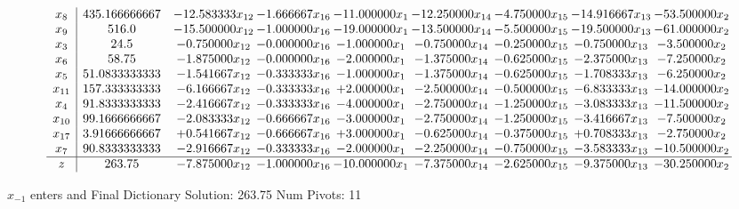 \documentclass[10pt]{article}
\begin{document}
 \[\begin{array}{c| c c@{\hskip 2pt} c@{\hskip 2pt} c@{\hskip 2pt} c@{\hskip 2pt} c@{\hskip 2pt} c@{\hskip 2pt} c@{\hskip 2pt} }
 x_{8}   &  435.166666667 & -12.583333 x_{12} & -1.666667 x_{16} & -11.000000 x_{1} & -12.250000 x_{14} & -4.750000 x_{15} & -14.916667 x_{13} & -53.500000 x_{2}\\
 x_{9}   &  516.0 & -15.500000 x_{12} & -1.000000 x_{16} & -19.000000 x_{1} & -13.500000 x_{14} & -5.500000 x_{15} & -19.500000 x_{13} & -61.000000 x_{2}\\
 x_{3}   &  24.5 & -0.750000 x_{12} & -0.000000 x_{16} & -1.000000 x_{1} & -0.750000 x_{14} & -0.250000 x_{15} & -0.750000 x_{13} & -3.500000 x_{2}\\
 x_{6}   &  58.75 & -1.875000 x_{12} & -0.000000 x_{16} & -2.000000 x_{1} & -1.375000 x_{14} & -0.625000 x_{15} & -2.375000 x_{13} & -7.250000 x_{2}\\
 x_{5}   &  51.0833333333 & -1.541667 x_{12} & -0.333333 x_{16} & -1.000000 x_{1} & -1.375000 x_{14} & -0.625000 x_{15} & -1.708333 x_{13} & -6.250000 x_{2}\\
 x_{11}   &  157.333333333 & -6.166667 x_{12} & -0.333333 x_{16} & + 2.000000 x_{1} & -2.500000 x_{14} & -0.500000 x_{15} & -6.833333 x_{13} & -14.000000 x_{2}\\
 x_{4}   &  91.8333333333 & -2.416667 x_{12} & -0.333333 x_{16} & -4.000000 x_{1} & -2.750000 x_{14} & -1.250000 x_{15} & -3.083333 x_{13} & -11.500000 x_{2}\\
 x_{10}   &  99.1666666667 & -2.083333 x_{12} & -0.666667 x_{16} & -3.000000 x_{1} & -2.750000 x_{14} & -1.250000 x_{15} & -3.416667 x_{13} & -7.500000 x_{2}\\
 x_{17}   &  3.91666666667 & + 0.541667 x_{12} & -0.666667 x_{16} & + 3.000000 x_{1} & -0.625000 x_{14} & -0.375000 x_{15} & + 0.708333 x_{13} & -2.750000 x_{2}\\
 x_{7}   &  90.8333333333 & -2.916667 x_{12} & -0.333333 x_{16} & -2.000000 x_{1} & -2.250000 x_{14} & -0.750000 x_{15} & -3.583333 x_{13} & -10.500000 x_{2}\\
\hline
z    &  263.75 & -7.875000 x_{12} & -1.000000 x_{16} & -10.000000 x_{1} & -7.375000 x_{14} & -2.625000 x_{15} & -9.375000 x_{13} & -30.250000 x_{2}\\
\end{array}\]


 $ x_{-1} $ enters and Final Dictionary
Solution:  263.75
Num Pivots:  11
\end{document}
